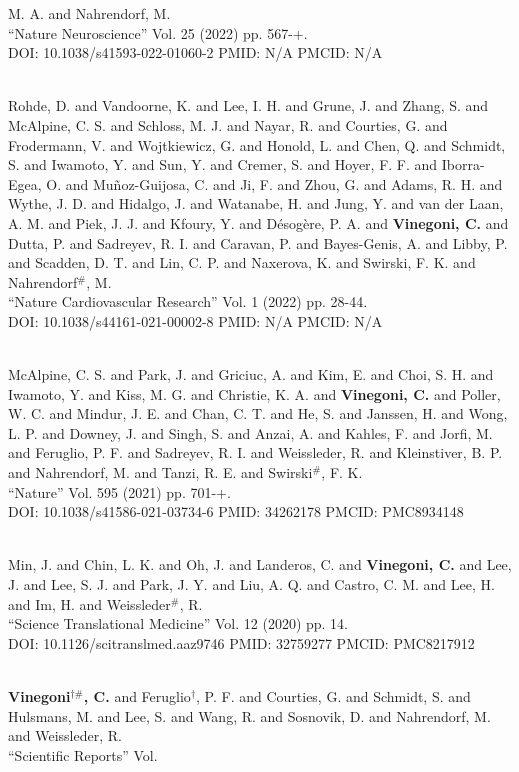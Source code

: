 M. A. and Nahrendorf, M. \\ ``Nature Neuroscience'' Vol. 25 (2022) pp. 567-+. \\ DOI: 10.1038/s41593-022-01060-2 PMID: N/A PMCID: N/A\item {} \\ Rohde, D. and Vandoorne, K. and Lee, I. H. and Grune, J. and Zhang, S. and McAlpine, C. S. and Schloss, M. J. and Nayar, R. and Courties, G. and Frodermann, V. and Wojtkiewicz, G. and Honold, L. and Chen, Q. and Schmidt, S. and Iwamoto, Y. and Sun, Y. and Cremer, S. and Hoyer, F. F. and Iborra-Egea, O. and Muñoz-Guijosa, C. and Ji, F. and Zhou, G. and Adams, R. H. and Wythe, J. D. and Hidalgo, J. and Watanabe, H. and Jung, Y. and van der Laan, A. M. and Piek, J. J. and Kfoury, Y. and Désogère, P. A. and {\bf Vinegoni, C.} and Dutta, P. and Sadreyev, R. I. and Caravan, P. and Bayes-Genis, A. and Libby, P. and Scadden, D. T. and Lin, C. P. and Naxerova, K. and Swirski, F. K. and Nahrendorf$^\#$, M. \\ ``Nature Cardiovascular Research'' Vol. 1 (2022) pp. 28-44. \\ DOI: 10.1038/s44161-021-00002-8 PMID: N/A PMCID: N/A\item {} \\ McAlpine, C. S. and Park, J. and Griciuc, A. and Kim, E. and Choi, S. H. and Iwamoto, Y. and Kiss, M. G. and Christie, K. A. and {\bf Vinegoni, C.} and Poller, W. C. and Mindur, J. E. and Chan, C. T. and He, S. and Janssen, H. and Wong, L. P. and Downey, J. and Singh, S. and Anzai, A. and Kahles, F. and Jorfi, M. and Feruglio, P. F. and Sadreyev, R. I. and Weissleder, R. and Kleinstiver, B. P. and Nahrendorf, M. and Tanzi, R. E. and Swirski$^\#$, F. K. \\ ``Nature'' Vol. 595 (2021) pp. 701-+. \\ DOI: 10.1038/s41586-021-03734-6 PMID: 34262178 PMCID: PMC8934148\item {} \\ Min, J. and Chin, L. K. and Oh, J. and Landeros, C. and {\bf Vinegoni, C.} and Lee, J. and Lee, S. J. and Park, J. Y. and Liu, A. Q. and Castro, C. M. and Lee, H. and Im, H. and Weissleder$^\#$, R. \\ ``Science Translational Medicine'' Vol. 12 (2020) pp. 14. \\ DOI: 10.1126/scitranslmed.aaz9746 PMID: 32759277 PMCID: PMC8217912\item {} \\ {\bf Vinegoni$^{\dag \#}$, C.} and Feruglio$^\dag$, P. F. and Courties, G. and Schmidt, S. and Hulsmans, M. and Lee, S. and Wang, R. and Sosnovik, D. and Nahrendorf, M. and Weissleder, R. \\ ``Scientific Reports'' Vol. 